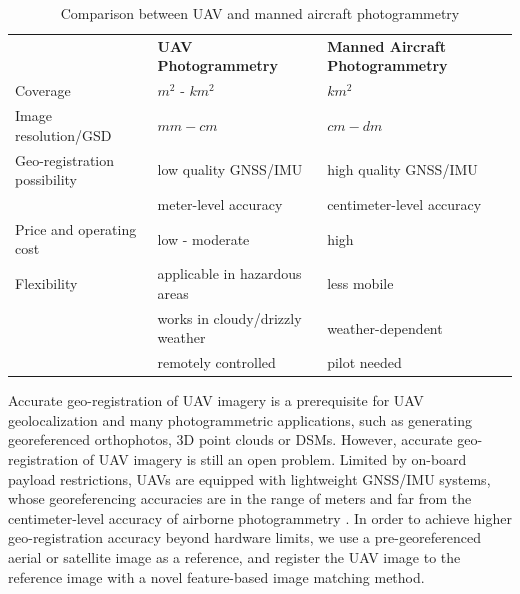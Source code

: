 \begin{table}[tbp]
  \begin{center}
  \small
  \begin{tabular}{@{}p{.29\linewidth}p{.31\linewidth}p{.34\linewidth}@{}}
    \toprule
    {} & {\textbf{UAV Photogrammetry}} & {\textbf{Manned Aircraft Photogrammetry}} \\
    \cmidrule(){1-3}
    Coverage & $m^{2}$ - $km^{2}$ & $km^{2}$ \\
    \addlinespace
    Image resolution/GSD& $mm - cm$ & $cm-dm$ \\
    \addlinespace
    Geo-registration possibility &  low quality GNSS/IMU & high quality GNSS/IMU \\
    &meter-level accuracy &centimeter-level accuracy\\
    \addlinespace
    Price and operating cost&low - moderate&high\\ 
    \addlinespace
    Flexibility & applicable in hazardous areas & less mobile\\ 
  & works in cloudy/drizzly weather & weather-dependent \\
  & remotely controlled & pilot needed \\
  \bottomrule
  \end{tabular}
  \end{center}
  \caption {Comparison between UAV and manned aircraft photogrammetry}
\label{tab:comp_UAV}
\end{table}


Accurate geo-registration of UAV imagery is a prerequisite for UAV geolocalization and many photogrammetric applications, such as generating georeferenced orthophotos, 3D point clouds or DSMs. 
However, accurate geo-registration of UAV imagery is still an open problem. Limited by on-board payload restrictions, UAVs are equipped with lightweight GNSS/IMU systems, whose georeferencing accuracies are in the range of meters \cite{chiabrando2013direct} and far from the centimeter-level accuracy of airborne photogrammetry \cite{jacobsen2010, Zhao2014122}. 
In order to achieve higher geo-registration accuracy beyond hardware limits, we use a pre-georeferenced aerial or satellite image as a reference, and register the UAV image to the reference image with a novel feature-based image matching method.


